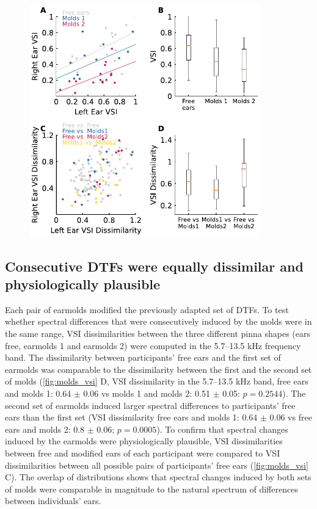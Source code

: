 \begin{figure}[t]
{\includegraphics[width=10cm]{../Results/figures/fig4/fig4}}
\end{figure}

\subsection{Consecutive DTFs were equally dissimilar and physiologically plausible}

Each pair of earmolds modified the previously adapted set of DTFs. To test whether spectral differences that were consecutively induced by the molds were in the same range, VSI dissimilarities between the three different pinna shapes (ears free, earmolds 1 and earmolds 2) were computed in the 5.7–13.5 kHz frequency band. The dissimilarity between participants' free ears and the first set of earmolds was comparable to the dissimilarity between the first and the second set of molds (\cref{fig:molds_vsi} D, VSI dissimilarity in the 5.7–13.5 kHz band, free ears and molds 1:  0.64 $\pm$ 0.06 vs molds 1 and molds 2:  0.51 $\pm$ 0.05: $p = 0.2544$). The second set of earmolds induced larger spectral differences to participants' free ears than the first set (VSI dissimilarity free ears and molds 1:  0.64 $\pm$ 0.06 vs free ears and molds 2: 0.8 $\pm$ 0.06; $p = 0.0005$).%
To confirm that spectral changes induced by the earmolds were physiologically plausible, VSI dissimilarities between free and modified ears of each participant were compared to VSI dissimilarities between all possible pairs of participants’ free ears (\cref{fig:molds_vsi} C). The overlap of distributions shows that spectral changes induced by both sets of molds were comparable in magnitude to the natural spectrum of differences between individuals’ ears.

